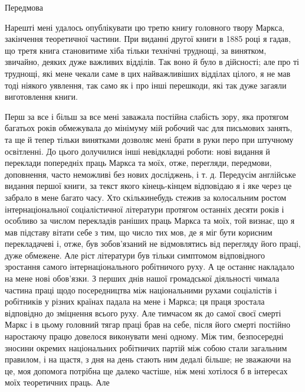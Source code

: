 Передмова

Нарешті мені удалось опублікувати цю третю книгу головного
твору Маркса, закінчення теоретичної частини. При виданні
другої книги в 1885 році я гадав, що третя книга становитиме
хіба тільки технічні труднощі, за винятком, звичайно, деяких
дуже важливих відділів. Так воно й було в дійсності; але про ті
труднощі, які мене чекали саме в цих найважливіших відділах
цілого, я не мав тоді ніякого уявлення, так само як і про інші
перешкоди, які так дуже загаяли виготовлення книги.

Перш за все і більш за все мені заважала постійна слабість
зору, яка протягом багатьох років обмежувала до мінімуму мій
робочий час для письмових занять, та ще й тепер тільки винятками
дозволяє мені брати в руки перо при штучному освітленні.
До цього долучилися інші невідкладні роботи: нові видання й
переклади попередніх праць Маркса та моїх, отже, перегляди,
передмови, доповнення, часто неможливі без нових досліджень,
і т. д. Передусім англійське видання першої книги, за текст
якого кінець-кінцем відповідаю я і яке через це забрало в мене
багато часу. Хто скількинебудь стежив за колосальним ростом
інтернаціональної соціалістичної літератури протягом останніх
десяти років і особливо за числом перекладів раніших праць
Маркса та моїх, той визнає, що я мав підставу вітати себе
з тим, що число тих мов, де я міг бути корисним перекладачеві
і, отже, був зобов’язаний не відмовлятись від перегляду його
праці, дуже обмежене. Але ріст літератури був тільки симптомом
відповідного зростання самого інтернаціонального робітничого
руху. А це останнє накладало на мене нові обов’язки.
З перших днів нашої громадської діяльності чимала частина праці
щодо посередництва між національними рухами соціалістів і робітників
у різних країнах падала на мене і Маркса; ця праця зростала
відповідно до зміцнення всього руху. Але тимчасом як
до самої своєї смерті Маркс і в цьому головний тягар праці
брав на себе, після його смерті постійно наростаючу працю довелося
виконувати мені одному. Між тим, безпосередні зносини
окремих національних робітничих партій між собою стали загальним
правилом, і на щастя, з дня на день стають ним дедалі більше;
не зважаючи на це, моя допомога потрібна ще далеко частіше,
ніж мені хотілося б в інтересах моїх теоретичних праць. Але
